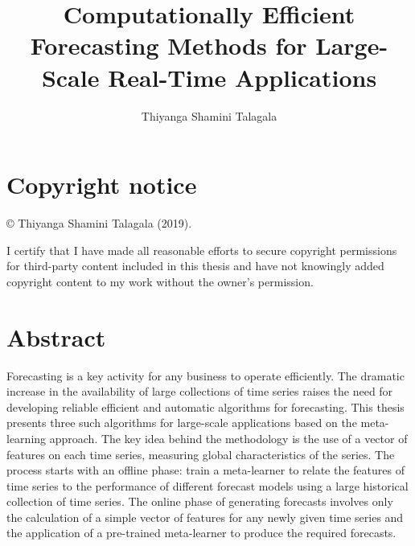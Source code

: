 \documentclass{monashthesis}
\author{Thiyanga Shamini Talagala}
\title{Computationally Efficient Forecasting Methods for Large-Scale Real-Time Applications}
\begin{document}

\titlepage

{\sf\tighttoc\doublespacing}

\hypertarget{copyright-notice}{%
\chapter*{Copyright notice}\label{copyright-notice}}

© Thiyanga Shamini Talagala (2019).

I certify that I have made all reasonable efforts to secure copyright permissions for third-party content included in this thesis and have not knowingly added copyright content to my work without the owner's permission.

\hypertarget{abstract}{%
\chapter*{Abstract}\label{abstract}}

Forecasting is a key activity for any business to operate efficiently. The dramatic increase in the availability of large collections of time series raises the need for developing reliable efficient and automatic algorithms for forecasting. This thesis presents three such algorithms for large-scale applications based on the meta-learning approach. The key idea behind the methodology is the use of a vector of features on each time series, measuring global characteristics of the series. The process starts with an offline phase: train a meta-learner to relate the features of time series to the performance of different forecast models using a large historical collection of time series. The online phase of generating forecasts involves only the calculation of a simple vector of features for any newly given time series and the application of a pre-trained meta-learner to produce the required forecasts.
\end{document}
